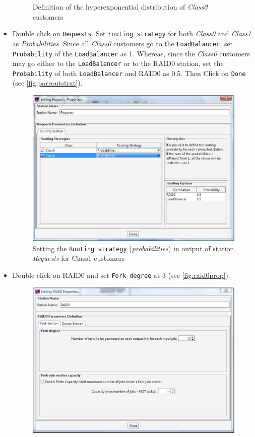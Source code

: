 \begin{itemize}
\begin{figure}[htb]
    \caption{Definition of the hyperexponential distribution
    of \emph{Class0} customers}
    \label{fig:hypeexponcl0}
\end{figure}
\item Double click on \texttt{Requests}. Set \texttt{routing
strategy} for both \emph{Class0} and \emph{Class1} as
\emph{Probabilities}. Since all \emph{Class0} customers go to the
\texttt{LoadBalancer}, set \texttt{Probability} of the
\texttt{LoadBalancer} as 1. Whereas, since the \emph{Class0}
customers may go either to the \texttt{LoadBalancer} or to the
RAID0 station, set the \texttt{Probability} of both
\texttt{LoadBalancer} and RAID0 as 0.5. Then Click on
\texttt{Done} (see \autoref{fig:parroutstrat}).
\begin{figure}[htb]
    \begin{center}
        \includegraphics[scale=.5]{img/jsimg/12.19.eps}
    \end{center}
    \caption{Setting the \texttt{Routing strategy} (\emph{probabilities}) in output
    of station \emph{Requests} for Class1 customers}
    \label{fig:parroutstrat}
\end{figure}
\item Double click on RAID0 and set \texttt{Fork degree} at 3 (see
\autoref{fig:raid0prop}).
\begin{figure}[htb]
    \begin{center}
        \includegraphics[scale=.5]{img/jsimg/12.20.eps}

\end{center}
\end{figure}
\end{itemize}
